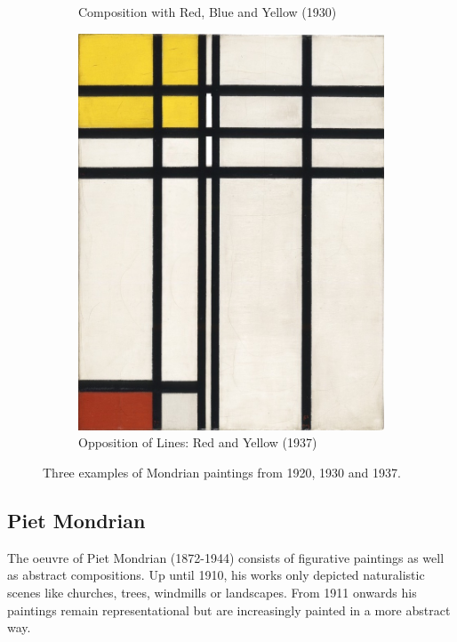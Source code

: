 \documentclass[serif,article,noparskip]{agse-thesis}
\begin{document}
\begin{figure}
\begin{subfigure}{.3\textwidth}
  \caption{Composition with Red, Blue and Yellow (1930)}
  \label{fig:sub2}
\end{subfigure}
\begin{subfigure}{.3\textwidth}
  \centering
  \includegraphics[width=\linewidth]{images/B273.jpg}
  \caption{Opposition of Lines: Red and Yellow (1937)}
  \label{fig:sub3}
\end{subfigure}
\caption{Three examples of Mondrian paintings from 1920, 1930 and 1937.}
\label{fig:mondrian}
\end{figure}

\subsection{Piet Mondrian}

The oeuvre of Piet Mondrian (1872-1944) consists of figurative paintings as well
as abstract compositions. Up until 1910, his works only depicted naturalistic
scenes like churches, trees, windmills or landscapes. From 1911 onwards his
paintings remain representational but are increasingly painted in a more
abstract way.
\end{document}
